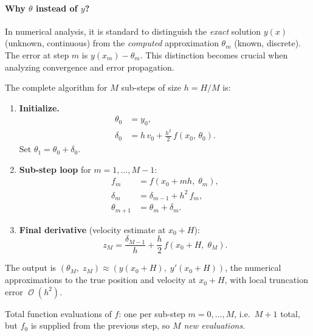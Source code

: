 \documentclass[11pt]{article}
\DeclareMathOperator{\OO}{\mathcal{O}}
\begin{document}
\paragraph{Why $\theta$ instead of $y$?} In numerical analysis, it is standard to distinguish the \emph{exact} solution $y(x)$ (unknown, continuous) from the \emph{computed} approximation $\theta_m$ (known, discrete). The error at step $m$ is $y(x_m) - \theta_m$. This distinction becomes crucial when analyzing convergence and error propagation.

\bigskip\noindent
The complete algorithm for $M$ sub-steps of size $h = H/M$ is:

\begin{enumerate}
  \item \textbf{Initialize.}
    \begin{align}
      \theta_0 &= y_0, \label{eq:alg-init-pos} \\
      \delta_0 &= h\, v_0 + \tfrac{h^2}{2}\, f(x_0,\, \theta_0). \label{eq:alg-init-delta}
    \end{align}
    Set $\theta_1 = \theta_0 + \delta_0$.

  \item \textbf{Sub-step loop} for $m = 1, \ldots, M-1$:
    \begin{align}
      f_m        &= f(x_0 + m h,\; \theta_m), \label{eq:alg-force} \\
      \delta_m   &= \delta_{m-1} + h^2\, f_m, \label{eq:alg-delta} \\
      \theta_{m+1} &= \theta_m + \delta_m. \label{eq:alg-pos}
    \end{align}

  \item \textbf{Final derivative} (velocity estimate at $x_0 + H$):
    \begin{equation}
      \label{eq:alg-vel}
      z_M = \frac{\delta_{M-1}}{h} + \frac{h}{2}\, f(x_0 + H,\; \theta_M).
    \end{equation}
\end{enumerate}

The output is $(\theta_M,\; z_M) \approx (y(x_0+H),\; y'(x_0+H))$,
the numerical approximations to the true position and velocity at $x_0 + H$,
with local truncation error $\OO(h^2)$.

Total function evaluations of $f$: one per sub-step $m = 0, \ldots, M$, i.e.\
$M+1$ total, but $f_0$ is supplied from the previous step, so \emph{$M$ new
evaluations}.

\end{document}
